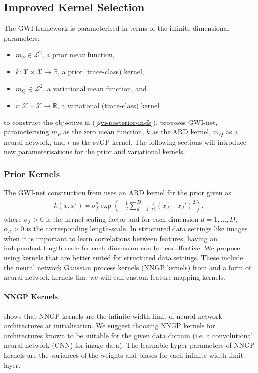 \documentclass{article}
\numberwithin{equation}{section}
\begin{document}
\subsection{Improved Kernel Selection}
The GWI framework is parameterised in terms of the infinite-dimensional parameters:
\begin{itemize}
    \setlength\itemsep{-0.25em}
    \item $m_P \in \mathcal{L}^2$, a prior mean function,
    \item $k: \mathcal{X} \times \mathcal{X} \rightarrow \mathbb{R}$, a prior (trace-class) kernel,
    \item $m_Q \in \mathcal{L}^2$, a variational mean function, and
    \item $r: \mathcal{X} \times \mathcal{X} \rightarrow \mathbb{R}$, a variational (trace-class) kernel
\end{itemize}
to construct the objective in (\ref{gvi-posterior-in-fs}). \cite{wild2022generalized} proposes GWI-net, parameterising $m_P$ as the zero mean function, $k$ as the ARD kernel, $m_Q$ as a neural network, and $r$ as the svGP kernel.
The following sections will introduce new parameterisations for the prior and variational kernels.

\subsubsection{Prior Kernels}\label{prior-kernels}
The GWI-net construction from \cite{wild2022generalized} uses an ARD kernel for the prior given as
\begin{align}
    k(x, x') = \sigma^2_f \exp\left(-\frac{1}{2} \sum_{d=1}^D \frac{1}{\alpha_d^2}(x_d-x_d')^2\right),
\end{align}
where $\sigma_f > 0$ is the kernel scaling factor and for each dimension $d=1, \dots, D$, $\alpha_d >0$ is the corresponding length-scale.
In structured data settings like images when it is important to learn correlations between features, having an independent length-scale for each dimension can be less effective.
We propose using kernels that are better suited for structured data settings. These include the neural network Gaussian process kernels (NNGP kernels) from \cite{novak2019neural} and a form of neural network kernels that we will call custom feature mapping kernels.

\paragraph{NNGP Kernels} \cite{novak2019neural} shows that NNGP kernels are the infinite width limit of neural network architectures at initialisation.
We suggest choosing NNGP kernels for architectures known to be suitable for the given data domain (i.e. a convolutional neural network (CNN) for image data).
The learnable hyper-parameters of NNGP kernels are the variances of the weights and biases for each infinite-width limit layer.
\end{document}
